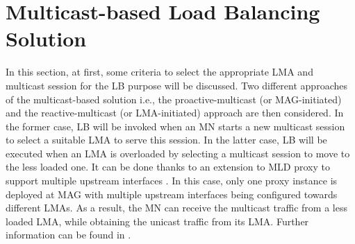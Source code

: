 \section{Multicast-based Load Balancing Solution}\label{ch7:solution}
In this section, at first, some criteria to select the appropriate LMA and multicast session for the LB purpose will be discussed. Two different approaches of the multicast-based solution i.e., the proactive-multicast (or MAG-initiated) and the reactive-multicast (or LMA-initiated) approach are then considered. In the former case, LB will be invoked when an MN starts a new multicast session to select a suitable LMA to serve this session. In the latter case, LB will be executed when an LMA is overloaded by selecting a multicast session to move to the less loaded one. It can be done thanks to an extension to MLD proxy to support multiple upstream interfaces \cite{multiple_upstreams}. In this case, only one proxy instance is deployed at MAG with multiple upstream interfaces being configured towards different LMAs. As a result, the MN can receive the multicast traffic from a less loaded LMA, while obtaining the unicast traffic from its LMA. Further information can be found in \cite{Thinh_elsevier_LB, Thinh_ICNC}.
